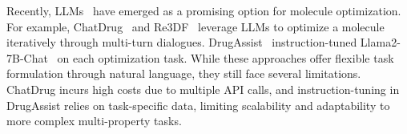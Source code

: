 
Recently, LLMs~\cite{chang2024} have emerged as a promising option for molecule optimization. 
%
For example,
ChatDrug~\cite{liu2023chatgpt} and Re3DF~\cite{le2024utilizing} leverage 
LLMs to optimize a molecule iteratively
through multi-turn dialogues.
%
DrugAssist~\cite{ye2025drugassist}
instruction-tuned Llama2-7B-Chat~\cite{touvron2023llama} 
on each optimization task. 
%
While these approaches offer flexible 
task formulation through natural language, they still face
several limitations.
%
ChatDrug incurs high costs due to multiple API calls, 
and
instruction-tuning in DrugAssist relies on task-specific data,
limiting scalability and adaptability to more complex multi-property tasks.
%
%
%

%

%
%

